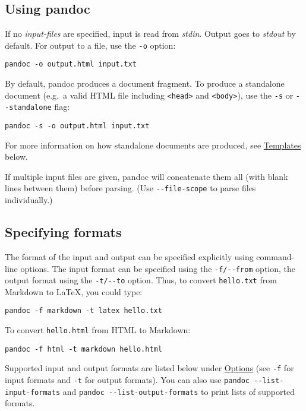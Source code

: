 \documentclass[
]{article}
\begin{document}
\subsection{Using pandoc}\label{using-pandoc}

If no \emph{input-files} are specified, input is read from \emph{stdin}.
Output goes to \emph{stdout} by default. For output to a file, use the
\texttt{-o} option:

\begin{verbatim}
pandoc -o output.html input.txt
\end{verbatim}

By default, pandoc produces a document fragment. To produce a standalone
document (e.g.~a valid HTML file including
\texttt{\textless{}head\textgreater{}} and
\texttt{\textless{}body\textgreater{}}), use the \texttt{-s} or
\texttt{-\/-standalone} flag:

\begin{verbatim}
pandoc -s -o output.html input.txt
\end{verbatim}

For more information on how standalone documents are produced, see
\hyperref[templates]{Templates} below.

If multiple input files are given, pandoc will concatenate them all
(with blank lines between them) before parsing. (Use
\texttt{-\/-file-scope} to parse files individually.)

\subsection{Specifying formats}\label{specifying-formats}

The format of the input and output can be specified explicitly using
command-line options. The input format can be specified using the
\texttt{-f/-\/-from} option, the output format using the
\texttt{-t/-\/-to} option. Thus, to convert \texttt{hello.txt} from
Markdown to LaTeX, you could type:

\begin{verbatim}
pandoc -f markdown -t latex hello.txt
\end{verbatim}

To convert \texttt{hello.html} from HTML to Markdown:

\begin{verbatim}
pandoc -f html -t markdown hello.html
\end{verbatim}

Supported input and output formats are listed below under
\hyperref[options]{Options} (see \texttt{-f} for input formats and
\texttt{-t} for output formats). You can also use
\texttt{pandoc\ -\/-list-input-formats} and
\texttt{pandoc\ -\/-list-output-formats} to print lists of supported
formats.
\end{document}
